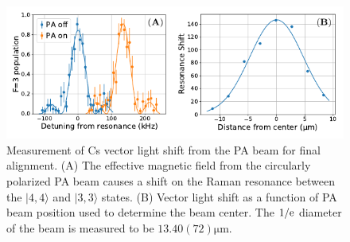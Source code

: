 \begin{figure}
  \centering
  \includegraphics[width=\textwidth]{figures/pa_vectorshift.pdf}
  \caption[PA beam alignment]{
    Measurement of Cs vector light shift from the PA beam for final alignment.
    (A) The effective magnetic field from the circularly polarized PA beam
    causes a shift on the Raman resonance between the $|4,4\rangle$ and $|3,3\rangle$ states.
    (B) Vector light shift as a function of PA beam position
    used to determine the beam center.
    The $1/\mathrm{e}$ diameter of the beam is measured to be $13.40(72) \mathrm{\mu m}$.
    \label{fig:pa-alignment}}
\end{figure}

